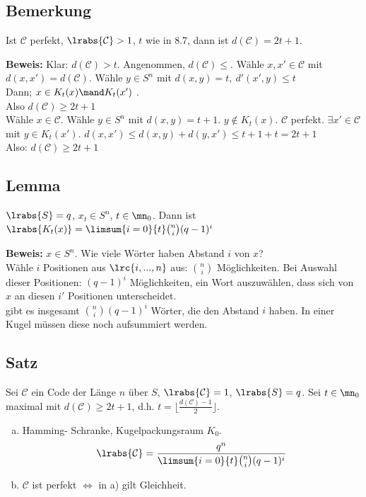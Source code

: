 	\subsection{Bemerkung}
		Ist $ \mathcal{C} $ perfekt, $ \lrabs{\mathcal{C}}>1 $, $ t $ wie in 8.7, dann ist $ d(\mathcal{C})=2t+1 $.
		
		\textbf{Beweis:} Klar: $ d(\mathcal{C})>t $. Angenommen, $ d(\mathcal{C})\leq $. Wähle $ x,x'\in\mathcal{C} $ mit $ d(x,x')=d(\mathcal{C}) $. Wähle $ y\in S^n $ mit $ d(x,y)=t,\ d'(x',y)\leq t $\\
		Dann; $ x\in K_t(x)\mand K_t(x') $ \lightning.\\
		Also $ d(\mathcal{C})\geq 2t+1 $\\
		Wähle $ x\in\mathcal{C} $. Wähle $ y\in S^n $ mit $ d(x,y)=t+1 $. $ y\notin K_t(x) $. $ \mathcal{C} $ perfekt. $ \exists x'\in\mathcal{C} $ mit $ y\in K_t(x') $. $ d(x,x')\leq d(x,y)+d(y,x') \leq t+1+t=2t+1 $\\
		Also: $ d(\mathcal{C})\geq 2t+1 $
		
	\subsection{Lemma}
		$ \lrabs{S}=q $, $ x_t\in S^n $, $ t\in\mn_0 $. Dann ist $ \lrabs{K_t(x)}=\limsum{i=0}{t}\binom{n}{i}(q-1)^i $
		
		\textbf{Beweis:} $ x\in S^n $. Wie viele Wörter haben Abstand $ i $ von $ x $?\\
		Wähle $ i $ Positionen aus $ \lrc{i,...,n} $ aus: $ \binom{n}{i} $ Möglichkeiten.
		Bei Auswahl dieser Positionen: $ (q-1)^i $ Möglichkeiten, ein Wort auszuwählen, dass sich von $ x $ an diesen $ i' $ Positionen unterscheidet.\\
		gibt es insgesamt $ \binom{n}{i}(q-1)^i $ Wörter, die den Abstand $ i $ haben. In einer Kugel müssen diese noch aufsummiert werden.
		
	\subsection{Satz}
		Sei $ \mathcal{C} $ ein Code der Länge $ n $ über $ S $, $ \lrabs{\mathcal{C}}=1 $, $ \lrabs{S}=q $. Sei $ t\in\mn_0 $ maximal mit $ d(\mathcal{C})\geq 2t+1 $, d.h. $ t=\lfloor\frac{d(\mathcal{C}) -1}{2}\rfloor $.
		\begin{enumerate}[a)]
			\item  Hamming- Schranke, Kugelpackungsraum $ K_0 $.
			\[\lrabs{\mathcal{C}}=\dfrac{q^n}{\limsum{i=0}{t}\binom{n}{i}(q-1)^i}\]
			\item  $ \mathcal{C} $ ist perfekt $ \Leftrightarrow $ in a) gilt Gleichheit.
		\end{enumerate}
		
